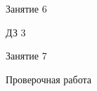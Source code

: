 \begin{class}[number=6]
	\begin{listofex}
		\item Занятие 6
	\end{listofex}
\end{class}

\begin{homework}[number=3]
	\begin{listofex}
		\item ДЗ 3
	\end{listofex}
\end{homework}

\begin{class}[number=7]
	\begin{listofex}
		\item Занятие 7
	\end{listofex}
\end{class}

\begin{exam}
	\begin{listofex}
		\item Проверочная работа
	\end{listofex}
\end{exam}
